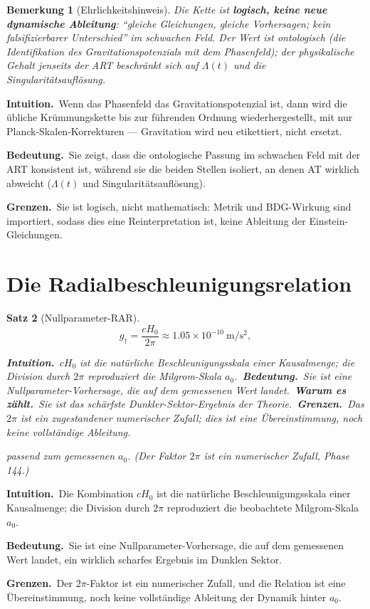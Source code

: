 \documentclass[10pt,twoside,openany]{book}
\newtheorem{theorem}{Satz}[chapter]
\newtheorem{remark}[theorem]{Bemerkung}
\newcommand{\theoremnotes}[3]{%
  \par\medskip\noindent
  \textbf{Intuition.}\ #1\par
  \textbf{Bedeutung.}\ #2\par
  \textbf{Grenzen.}\ #3\par}
\newcommand{\eqnotes}[4]{%
  \par\smallskip\noindent
  \textbf{Intuition.}\ #1\ 
  \textbf{Bedeutung.}\ #2\ 
  \textbf{Warum es zählt.}\ #3\ 
  \textbf{Grenzen.}\ #4\par}
\begin{document}
\begin{remark}[Ehrlichkeitshinweis]
Die Kette ist \textbf{logisch, keine neue dynamische Ableitung}: ``gleiche Gleichungen,
gleiche Vorhersagen; kein falsifizierbarer Unterschied'' im schwachen Feld. Der Wert ist
\emph{ontologisch} (die Identifikation des Gravitationspotenzials mit dem Phasenfeld); der
physikalische Gehalt jenseits der ART beschränkt sich auf $\Lambda(t)$ und die
Singularitätsauflösung.
\end{remark}

\theoremnotes
{Wenn das Phasenfeld das Gravitationspotenzial ist, dann wird die übliche Krümmungskette
bis zur führenden Ordnung wiederhergestellt, mit nur Planck-Skalen-Korrekturen ---
Gravitation wird neu etikettiert, nicht ersetzt.}
{Sie zeigt, dass die ontologische Passung im schwachen Feld mit der ART konsistent ist,
während sie die beiden Stellen isoliert, an denen AT wirklich abweicht ($\Lambda(t)$ und
Singularitätsauflösung).}
{Sie ist logisch, nicht mathematisch: Metrik und BDG-Wirkung sind importiert, sodass dies
eine Reinterpretation ist, keine Ableitung der Einstein-Gleichungen.}

\section{Die Radialbeschleunigungsrelation}

\begin{theorem}[Nullparameter-RAR]
\begin{equation}
g_\dagger = \frac{c H_0}{2\pi} \approx 1.05\times10^{-10}\ \mathrm{m/s^2},
\end{equation}

\eqnotes
{$cH_0$ ist die natürliche Beschleunigungsskala einer Kausalmenge; die Division durch
$2\pi$ reproduziert die Milgrom-Skala $a_0$.}
{Sie ist eine Nullparameter-Vorhersage, die auf dem gemessenen Wert landet.}
{Sie ist das schärfste Dunkler-Sektor-Ergebnis der Theorie.}
{Das $2\pi$ ist ein zugestandener numerischer Zufall; dies ist eine Übereinstimmung, noch
keine vollständige Ableitung.}
passend zum gemessenen $a_0$. (Der Faktor $2\pi$ ist ein numerischer Zufall, Phase 144.)
\end{theorem}

\theoremnotes
{Die Kombination $cH_0$ ist die natürliche Beschleunigungsskala einer Kausalmenge; die
Division durch $2\pi$ reproduziert die beobachtete Milgrom-Skala $a_0$.}
{Sie ist eine Nullparameter-Vorhersage, die auf dem gemessenen Wert landet, ein wirklich
scharfes Ergebnis im Dunklen Sektor.}
{Der $2\pi$-Faktor ist ein numerischer Zufall, und die Relation ist eine Übereinstimmung,
noch keine vollständige Ableitung der Dynamik hinter $a_0$.}
\end{document}
